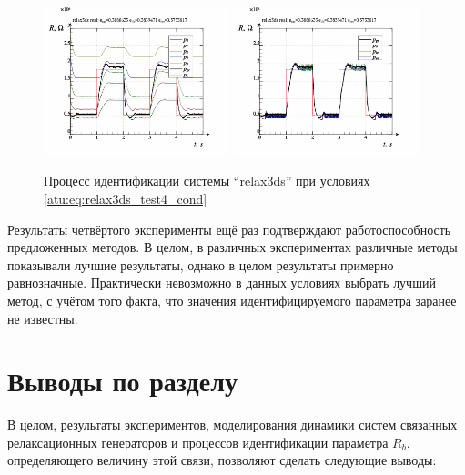 \begin{figure}[htb!]
  \centerline{
    \includegraphics[width=0.48\textwidth]{p/relax3ds_read_id2_3-p_p.png}
    \hfill
    \includegraphics[width=0.48\textwidth]{p/relax3ds_read_id2_3-p_pp.png}
  }
  \caption{Процесс идентификации системы ``relax3ds'' при условиях \ref{atu:eq:relax3ds_test4_cond}}
  \label{atu:f:relax3ds_id_3}
\end{figure}

Результаты четвёртого эксперименты ещё раз
подтверждают работоспособность предложенных методов.
В целом, в различных экспериментах различные методы
показывали лучшие результаты, однако в целом результаты
примерно равнозначные. Практически невозможно в данных условиях выбрать лучший
метод, с учётом того факта, что значения идентифицируемого
параметра заранее не известны.




\section{Выводы по разделу \thechapter}

В целом, результаты экспериментов,
моделирования динамики систем связанных релаксационных генераторов
и процессов идентификации параметра $R_b$, определяющего величину этой связи,
позволяют сделать следующие выводы:


